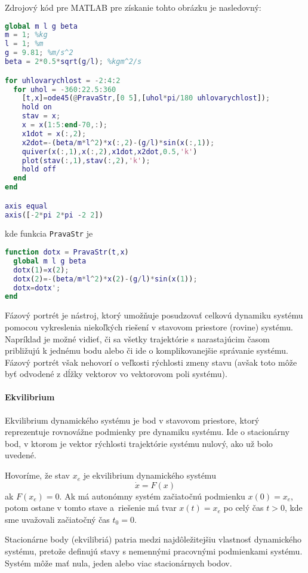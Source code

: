 \documentclass[a4paper, 10pt, ]{article}
\begin{document}
Zdrojový kód pre MATLAB pre získanie tohto obrázku je nasledovný:
\begin{lstlisting}[language=Matlab, title=Kód pre vygenerovanie obr.~\ref{Fázový portrét kyvadla}]
global m l g beta
m = 1; %kg
l = 1; %m
g = 9.81; %m/s^2
beta = 2*0.5*sqrt(g/l); %kgm^2/s

for uhlovarychlost = -2:4:2
  for uhol = -360:22.5:360
    [t,x]=ode45(@PravaStr,[0 5],[uhol*pi/180 uhlovarychlost]);
    hold on
    stav = x;
    x = x(1:5:end-70,:);
    x1dot = x(:,2);
    x2dot=-(beta/m*l^2)*x(:,2)-(g/l)*sin(x(:,1));
    quiver(x(:,1),x(:,2),x1dot,x2dot,0.5,'k')
    plot(stav(:,1),stav(:,2),'k');
    hold off
  end
end

axis equal
axis([-2*pi 2*pi -2 2])
\end{lstlisting}
kde funkcia \verb|PravaStr| je
\begin{lstlisting}[language=Matlab]
function dotx = PravaStr(t,x)
  global m l g beta
  dotx(1)=x(2);
  dotx(2)=-(beta/m*l^2)*x(2)-(g/l)*sin(x(1));
  dotx=dotx';
end
\end{lstlisting}


Fázový portrét je nástroj, ktorý umožňuje posudzovať celkovú dynamiku systému pomocou vykreslenia niekoľkých riešení v stavovom priestore (rovine) systému. Napríklad je možné vidieť, či sa všetky trajektórie s narastajúcim časom približujú k jednému bodu alebo či ide o komplikovanejšie správanie systému. Fázový portrét však nehovorí o veľkosti rýchlosti zmeny stavu (avšak toto môže byť odvodené z dĺžky vektorov vo vektorovom poli systému).


\paragraph{Ekvilibrium}

Ekvilibrium dynamického systému je bod v stavovom priestore, ktorý reprezentuje rovnovážne podmienky pre dynamiku systému. Ide o stacionárny bod, v ktorom je vektor rýchlosti trajektórie systému nulový, ako už bolo uvedené.

Hovoríme, že stav $x_e$ je ekvilibrium dynamického systému
\begin{equation*}
	\dot{x} = F(x)
\end{equation*}
ak $F(x_e) = 0$. Ak má autonómny systém začiatočnú podmienku $x(0) = x_e$, potom ostane v tomto stave a~riešenie má tvar $x(t) = x_e$ po celý čas $t>0$, kde sme uvažovali začiatočný čas $t_0 = 0$.

Stacionárne body (ekvilibriá) patria medzi najdôležitejšiu vlastnosť dynamického systému, pretože definujú stavy s nemennými pracovnými podmienkami systému. Systém môže mať nula, jeden alebo viac stacionárnych bodov.
\end{document}
